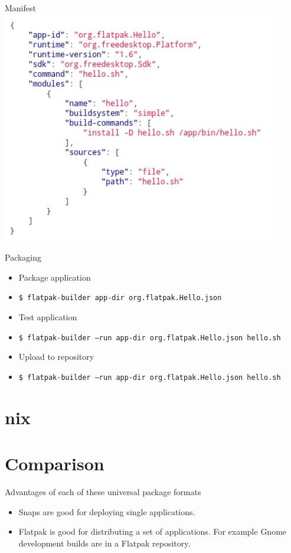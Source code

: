 \documentclass{lug}
\begin{document}
\begin{frame}{Manifest}
    \center
    \includegraphics[width=0.9\textwidth]{./graphics/flatpak_json.png}
\end{frame}

\begin{frame}{Packaging}
    \begin{itemize}
        \item Package application
        \item \texttt{\$\ flatpak-builder app-dir org.flatpak.Hello.json}
        \item Test application
        \item \texttt{\$\ flatpak-builder --run app-dir org.flatpak.Hello.json hello.sh}
        \item Upload to repository
        \item \texttt{\$\ flatpak-builder --run app-dir org.flatpak.Hello.json hello.sh}
    \end{itemize}
\end{frame}


\section{nix}

\section{Comparison}
\begin{frame}{Advantages of each of these universal package formats}
    \begin{itemize}
        \item Snaps are good for deploying single applications.
        \item Flatpak is good for distributing a set of applications. For
            example Gnome development builds are in a Flatpak repository.
    \end{itemize}
\end{frame}
\end{document}

